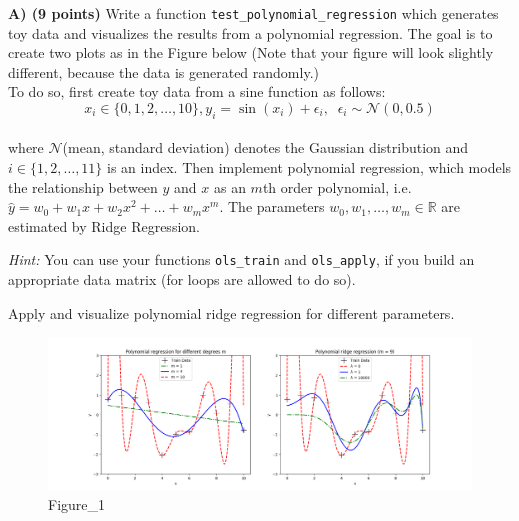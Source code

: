 \documentclass[11pt]{article}
\makeatletter
\def\maxwidth{\ifdim\Gin@nat@width>\linewidth\linewidth
    \else\Gin@nat@width\fi}
\let\Oldincludegraphics\includegraphics
\renewcommand{\includegraphics}[1]{\Oldincludegraphics[width=.8\maxwidth]{#1}}
\makeatother
\begin{document}
    \textbf{A) (9 points)} Write a function
\texttt{test\_polynomial\_regression} which generates toy data and
visualizes the results from a polynomial regression. The goal is to
create two plots as in the Figure below (Note that your figure will look
slightly different, because the data is generated randomly.)\\
To do so, first create toy data from a sine function as follows:\\
\[x_i \in \{0, 1, 2, \ldots, 10\}, y_i = \sin(x_i) + \epsilon_i, \; \; \epsilon_i \sim \mathcal{N}(0, 0.5)\]\\
where \(\mathcal{N}\)(mean, standard deviation) denotes the Gaussian
distribution and \(i \in \{1, 2, \ldots, 11\}\) is an index. Then
implement polynomial regression, which models the relationship between
\(y\) and \(x\) as an \(m\)th order polynomial, i.e.
\(\hat{y} = w_0 + w_1 x + w_2 x^2 + \ldots + w_m x^m\). The parameters
\(w_0, w_1, \ldots , w_m \in \mathbb R\) are estimated by Ridge
Regression.

\emph{Hint:} You can use your functions \texttt{ols\_train} and
\texttt{ols\_apply}, if you build an appropriate data matrix (for loops
are allowed to do so).

Apply and visualize polynomial ridge regression for different
parameters.

    \begin{figure}
\centering
\includegraphics{Figure_1.png}
\caption{Figure\_1}
\end{figure}
\end{document}
